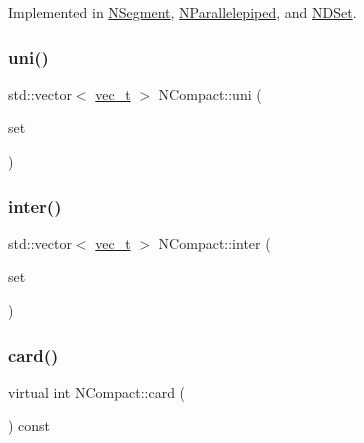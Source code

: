 Implemented in \mbox{\hyperlink{class_n_segment_a9370351370e57d265f990b3e9d2ab114}{N\+Segment}}, \mbox{\hyperlink{class_n_parallelepiped_abe05e06f34b0be7d18c098ef7821edf3}{N\+Parallelepiped}}, and \mbox{\hyperlink{class_n_d_set_a0023b3999000c4d5ed05704d7346466d}{N\+D\+Set}}.

\mbox{\label{class_n_compact_a64fb223b2f03a10d80e1290f1947f026}} 
\subsubsection{\texorpdfstring{uni()}{uni()}}
{\footnotesize\ttfamily std\+::vector$<$ \mbox{\hyperlink{_n_vector_8h_a0a2cfc67e738a3d73e4f12098c4c07f6}{vec\+\_\+t}} $>$ N\+Compact\+::uni (\begin{DoxyParamCaption}\item[{const \mbox{\hyperlink{class_n_compact}{N\+Compact}} \&}]{set }\end{DoxyParamCaption})\hspace{0.3cm}{\ttfamily [virtual]}}

\mbox{\label{class_n_compact_a5806924822793fdd89f4168e1e8c4d3c}} 
\subsubsection{\texorpdfstring{inter()}{inter()}}
{\footnotesize\ttfamily std\+::vector$<$ \mbox{\hyperlink{_n_vector_8h_a0a2cfc67e738a3d73e4f12098c4c07f6}{vec\+\_\+t}} $>$ N\+Compact\+::inter (\begin{DoxyParamCaption}\item[{const \mbox{\hyperlink{class_n_compact}{N\+Compact}} \&}]{set }\end{DoxyParamCaption})\hspace{0.3cm}{\ttfamily [virtual]}}

\mbox{\label{class_n_compact_a816bb4976567a7bfed57763ce717b685}} 
\subsubsection{\texorpdfstring{card()}{card()}}
{\footnotesize\ttfamily virtual int N\+Compact\+::card (\begin{DoxyParamCaption}{ }\end{DoxyParamCaption}) const\hspace{0.3cm}{\ttfamily [pure virtual]}}



